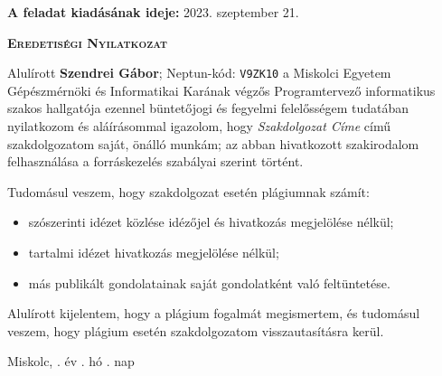 
\bigskip
\noindent\textbf{A feladat kiadásának ideje:} 2023. szeptember 21.


\vspace{1.5cm}

\hfill\makebox[6cm]{\dotfill}

\hfill{}

\clearpage

\vspace*{1cm}  
\begin{center}
\large\textsc{\textbf{Eredetiségi Nyilatkozat}}
\end{center}
\vspace*{2cm}  

Alulírott \textbf{Szendrei Gábor}; Neptun-kód: \texttt{V9ZK10} a Miskolci Egyetem Gépészmérnöki és Informatikai Karának végzős Programtervező informatikus szakos hallgatója ezennel büntetőjogi és fegyelmi felelősségem tudatában nyilatkozom és aláírásommal igazolom, hogy \textit{Szakdolgozat Címe}
című szakdolgozatom saját, önálló munkám; az abban hivatkozott szakirodalom
felhasználása a forráskezelés szabályai szerint történt.

\medskip
Tudomásul veszem, hogy szakdolgozat esetén plágiumnak számít:
\begin{itemize}
\item szószerinti idézet közlése idézőjel és hivatkozás megjelölése nélkül;
\item tartalmi idézet hivatkozás megjelölése nélkül;
\item más publikált gondolatainak saját gondolatként való feltüntetése.
\end{itemize}

Alulírott kijelentem, hogy a plágium fogalmát megismertem, és tudomásul veszem, hogy
plágium esetén szakdolgozatom visszautasításra kerül.

\vspace*{3cm}

\noindent Miskolc, \makebox[2cm]{\dotfill}. év \makebox[2cm]{\dotfill}. hó \makebox[2cm]{\dotfill}. nap

\vspace*{3cm}

\hfill\makebox[6cm]{\dotfill}


